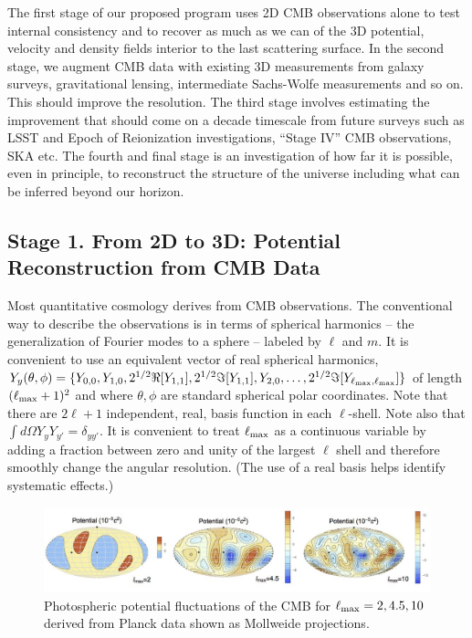 \documentclass[psfig,11pt]{article}
\def\ni{\noindent}
\begin{document}
The first stage of our proposed program uses 2D CMB observations alone to test internal consistency and to recover as much as we can of the 3D potential, velocity and density fields interior to the last scattering surface. In the second stage, we augment CMB data with existing 3D measurements from galaxy surveys, gravitational lensing, intermediate Sachs-Wolfe measurements and so on. This should improve the resolution. The third stage involves estimating the improvement that should come on a decade timescale from future surveys such as LSST and Epoch of Reionization investigations, ``Stage IV'' CMB observations, SKA etc. The fourth and final stage is an investigation of how far it is possible, even in principle,  to reconstruct the structure of the universe including what can be inferred beyond our horizon.


\subsection{Stage 1. From 2D to 3D: Potential Reconstruction from CMB Data}
\ni{\bf Temperature Fluctuations:}
Most quantitative cosmology derives from CMB observations. The conventional way to describe the observations is in terms of spherical harmonics -- the generalization of Fourier modes to a sphere -- labeled by $\ell$ and $m$. It is convenient to use an equivalent vector of real spherical harmonics, $Y_y(\theta,\phi)=\{Y_{0,0},Y_{1,0},2^{1/2}\Re[Y_{1,1}],2^{1/2}\Im[Y_{1,1}],Y_{2,0},\dots,2^{1/2}\Im[Y_{\ell_{\rm max},\ell_{\rm max}}]\}$ of length $(\ell_{\rm max}+1)^2$ and where $\theta,\phi$ are standard spherical polar coordinates. Note that there are $2\ell+1$ independent, real, basis function in each $\ell$-shell. Note also that $\int d\Omega Y_yY_{y'}=\delta_{yy'}$. It is convenient to treat $\ell_{\rm max}$ as a continuous variable by adding a fraction between zero and unity of the largest $\ell$ shell and therefore smoothly change the angular resolution. (The use of a real basis helps identify systematic effects.)
\begin{figure}[t]
\centering
\includegraphics[width=6in]{figures/nsffig2.jpg}
\caption{{\small Photospheric potential fluctuations of the CMB for $\ell_{\rm max}=2,4.5,10$ derived from Planck data shown as Mollweide projections.}}
\end{figure}
\end{document}
